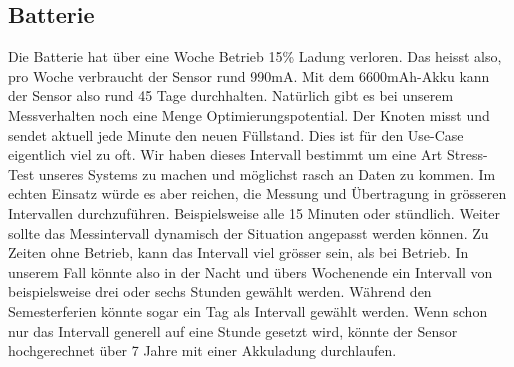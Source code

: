 \subsection*{Batterie}
Die Batterie hat über eine Woche Betrieb 15\% Ladung verloren. Das heisst also, pro Woche verbraucht der Sensor rund 990mA. Mit dem 6600mAh-Akku kann der Sensor also rund 45 Tage durchhalten.
Natürlich gibt es bei unserem Messverhalten noch eine Menge Optimierungspotential. Der Knoten misst und sendet aktuell jede Minute den neuen Füllstand. Dies ist für den Use-Case eigentlich viel zu oft. Wir haben dieses Intervall bestimmt um eine Art \glqq{}Stress-Test\grqq{} unseres Systems zu machen und möglichst rasch an Daten zu kommen. Im echten Einsatz würde es aber reichen, die Messung und Übertragung in grösseren Intervallen durchzuführen. Beispielsweise alle 15 Minuten oder stündlich. Weiter sollte das Messintervall dynamisch der Situation angepasst werden können. Zu Zeiten ohne Betrieb, kann das Intervall viel grösser sein, als bei Betrieb. In unserem Fall könnte also in der Nacht und übers Wochenende ein Intervall von beispielsweise drei oder sechs Stunden gewählt werden. Während den Semesterferien könnte sogar ein Tag als Intervall gewählt werden.
Wenn schon nur das Intervall generell auf eine Stunde gesetzt wird, könnte der Sensor hochgerechnet über 7 Jahre mit einer Akkuladung durchlaufen.
